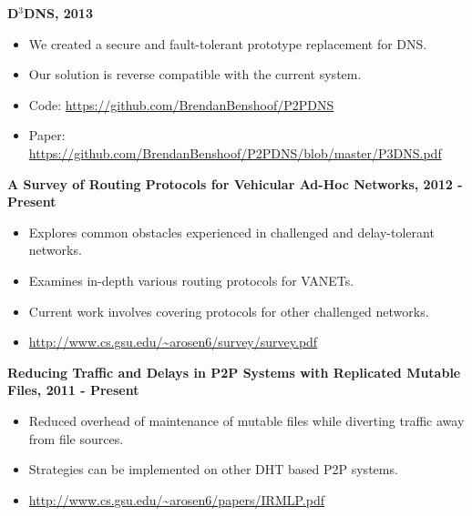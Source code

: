 \documentclass{res}
\begin{document}
\begin{resume}
{\bf D$^3$DNS, 2013 }
    \begin{itemize}
    \item We created a secure and fault-tolerant prototype replacement for DNS.
    \item Our solution is reverse compatible with the current system.
    \item Code: \url{https://github.com/BrendanBenshoof/P2PDNS}
    \item Paper: \url{https://github.com/BrendanBenshoof/P2PDNS/blob/master/P3DNS.pdf}
    \end{itemize}

 
%    


{\bf A Survey of Routing Protocols for Vehicular Ad-Hoc Networks, 2012 - Present}
    \begin{itemize}
    \item Explores common obstacles experienced in challenged and delay-tolerant networks.
    \item Examines in-depth various routing protocols for VANETs.
    \item Current work involves covering protocols for other challenged networks.
    \item \url{http://www.cs.gsu.edu/~arosen6/survey/survey.pdf}
    \end{itemize}

{\bf Reducing Traffic and Delays in P2P Systems with Replicated Mutable Files,  2011 - Present}
    \begin{itemize}
    \item Reduced overhead of maintenance of mutable files while diverting traffic  away from file sources.
    \item Strategies can be implemented on other DHT based P2P systems.
    \item \url{http://www.cs.gsu.edu/~arosen6/papers/IRMLP.pdf}
    \end{itemize}



\end{resume}
\end{document}
